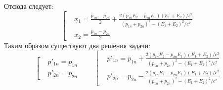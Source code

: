 Отсюда следует:
\[
	\left[
	\begin{aligned}
		& x_1 = \frac{p_{1n} - p_{2n}}{2} + \frac{2 (p_{1n} E_2 - p_{2n} E_1) (E_1 + E_2)/c^2}{(p_{1n} + p_{2n})^2 - (E_1 + E_2)^2/c^2} \\
		& x_2 = \frac{p_{1n} - p_{2n}}{2}
	\end{aligned}
	\right.
\]
Таким образом существуют два решения задачи:
\[
	\left[
	\begin{aligned}
	& p'_{1n} = p_{1n} \\
	& p'_{2n} = p_{2n}
	\end{aligned}
	\right.
	\qquad	
	\left[
	\begin{aligned}
	& p'_{1n} = p_{1n} + \frac{2 (p_{1n} E_2 - p_{2n} E_1) (E_1 + E_2)/c^2}{(p_{1n} + p_{2n})^2 - (E_1 + E_2)^2/c^2} \\
	& p'_{2n} = p_{2n} - \frac{2 (p_{1n} E_2 - p_{2n} E_1) (E_1 + E_2)/c^2}{(p_{1n} + p_{2n})^2 - (E_1 + E_2)^2/c^2}
	\end{aligned}
	\right.
\]